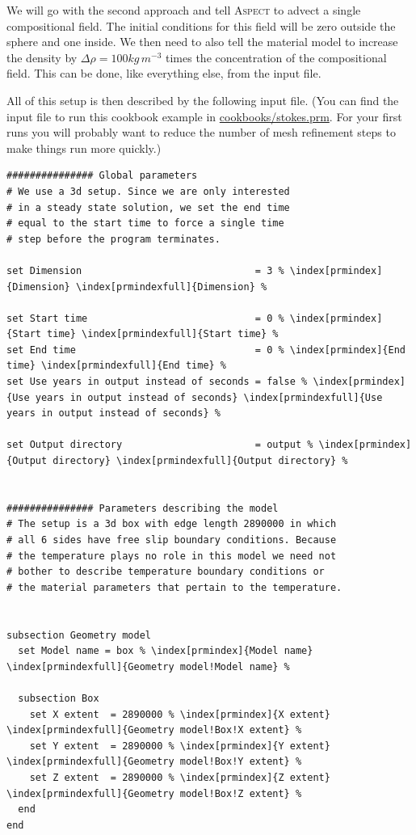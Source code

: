 \documentclass{article}
\newcommand{\aspect}{\textsc{Aspect}}
\begin{document}
We will go with the second approach and tell \aspect{} to advect a single
compositional field. The initial conditions for this field will be zero outside
the sphere and one inside. We then need to also tell the material model to
increase the density by $\Delta\rho=100 kg\, m^{-3}$ times the concentration of
the compositional field. This can be done, like everything else, from the input
file.

All of this setup is then described by the following input file.
(You can find the input file to run this cookbook example in
\url{cookbooks/stokes.prm}. For your first runs you will probably want to
reduce the number of mesh refinement steps to make things run more quickly.)

\begin{lstlisting}[frame=single,language=prmfile,escapechar=\%]
############### Global parameters
# We use a 3d setup. Since we are only interested
# in a steady state solution, we set the end time
# equal to the start time to force a single time
# step before the program terminates.

set Dimension                              = 3 % \index[prmindex]{Dimension} \index[prmindexfull]{Dimension} %

set Start time                             = 0 % \index[prmindex]{Start time} \index[prmindexfull]{Start time} %
set End time                               = 0 % \index[prmindex]{End time} \index[prmindexfull]{End time} %
set Use years in output instead of seconds = false % \index[prmindex]{Use years in output instead of seconds} \index[prmindexfull]{Use years in output instead of seconds} %

set Output directory                       = output % \index[prmindex]{Output directory} \index[prmindexfull]{Output directory} %


############### Parameters describing the model
# The setup is a 3d box with edge length 2890000 in which
# all 6 sides have free slip boundary conditions. Because
# the temperature plays no role in this model we need not
# bother to describe temperature boundary conditions or
# the material parameters that pertain to the temperature.


subsection Geometry model
  set Model name = box % \index[prmindex]{Model name} \index[prmindexfull]{Geometry model!Model name} %

  subsection Box
    set X extent  = 2890000 % \index[prmindex]{X extent} \index[prmindexfull]{Geometry model!Box!X extent} %
    set Y extent  = 2890000 % \index[prmindex]{Y extent} \index[prmindexfull]{Geometry model!Box!Y extent} %
    set Z extent  = 2890000 % \index[prmindex]{Z extent} \index[prmindexfull]{Geometry model!Box!Z extent} %
  end
end



\end{lstlisting}
\end{document}

